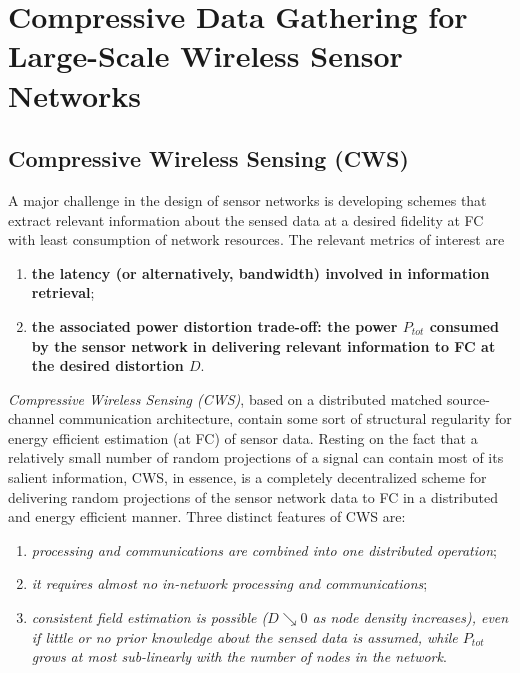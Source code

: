 \chapter{Compressive Data Gathering for Large-Scale Wireless Sensor Networks}
\label{CDG}

\section{Compressive Wireless Sensing (CWS)}
A major challenge in the design of sensor networks is developing \textcolor[rgb]{0,0,1}{schemes that extract relevant information about the sensed data} at a desired fidelity at FC with \textcolor[rgb]{0,0,1}{least consumption of network resources}. The relevant metrics of interest are
\begin{enumerate}
    \item \textbf{\textcolor[rgb]{0,0,1}{the latency (or alternatively, bandwidth) involved in information retrieval}};
    \item \textbf{\textcolor[rgb]{0,0,1}{the associated power distortion trade-off: the power $P_{tot}$ consumed by the sensor network in delivering relevant information to FC at the desired distortion $D$}}.
\end{enumerate}

\emph{\textcolor[rgb]{0,0,1}{Compressive Wireless Sensing (CWS)}}, based on a distributed matched source-channel communication architecture, contain some sort of structural regularity for energy efficient estimation (at FC) of sensor data. Resting on the fact that a relatively small number of random projections of a signal can contain most of its salient information, CWS, in essence, is a completely decentralized scheme for delivering random projections of the sensor network data to FC in a distributed and energy efficient manner. Three distinct features of CWS are:
\begin{enumerate}
    \item \emph{\textcolor[rgb]{0,0,1}{processing and communications are combined into one distributed operation}};
    \item \emph{\textcolor[rgb]{0,0,1}{it requires almost no in-network processing and communications}};
    \item \emph{\textcolor[rgb]{0,0,1}{consistent field estimation is possible ($D\searrow0$ as node density increases), even if little or no prior knowledge about the sensed data is assumed, while $P_{tot}$ grows at most sub-linearly with the number of nodes in the network}}.
\end{enumerate}

